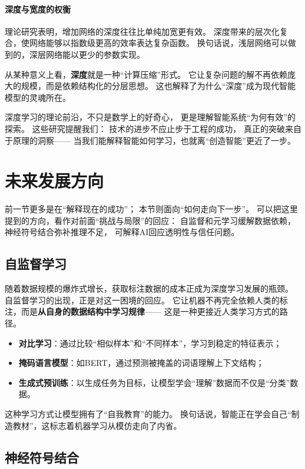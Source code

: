 \paragraph{深度与宽度的权衡}  
理论研究表明，增加网络的深度往往比单纯加宽更有效。  
深度带来的层次化复合，使网络能够以指数级更高的效率表达复杂函数。  
换句话说，浅层网络可以做到的，深层网络能以更少的参数实现。  

从某种意义上看，\textbf{深度}就是一种“计算压缩”形式。  
它让复杂问题的解不再依赖庞大的规模，而是依赖结构化的分层思想。  
这也解释了为什么“深度”成为现代智能模型的灵魂所在。  

深度学习的理论前沿，不只是数学上的好奇心，  
更是理解智能系统“为何有效”的探索。  
这些研究提醒我们：  
技术的进步不应止步于工程的成功，  
真正的突破来自于原理的洞察——  
当我们能解释智能如何学习，也就离“创造智能”更近了一步。

\section{未来发展方向}

前一节更多是在“解释现在的成功”；  
本节则面向“如何走向下一步”。  
可以把这里提到的方向，看作对前面“挑战与局限”的回应：  
自监督和元学习缓解数据依赖，  
神经符号结合弥补推理不足，  
可解释AI回应透明性与信任问题。

\subsection{自监督学习}

随着数据规模的爆炸式增长，获取标注数据的成本正成为深度学习发展的瓶颈。  
自监督学习的出现，正是对这一困境的回应。  
它让机器不再完全依赖人类的标注，而是\textbf{从自身的数据结构中学习规律}——  
这是一种更接近人类学习方式的路径。

\begin{itemize}
\item \textbf{对比学习}：通过比较“相似样本”和“不同样本”，学习到稳定的特征表示；
\item \textbf{掩码语言模型}：如BERT，通过预测被掩盖的词语理解上下文结构；
\item \textbf{生成式预训练}：以生成任务为目标，让模型学会“理解”数据而不仅是“分类”数据。
\end{itemize}

这种学习方式让模型拥有了“自我教育”的能力。  
换句话说，智能正在学会自己“制造教材”，这标志着机器学习从模仿走向了内省。

\subsection{神经符号结合}

